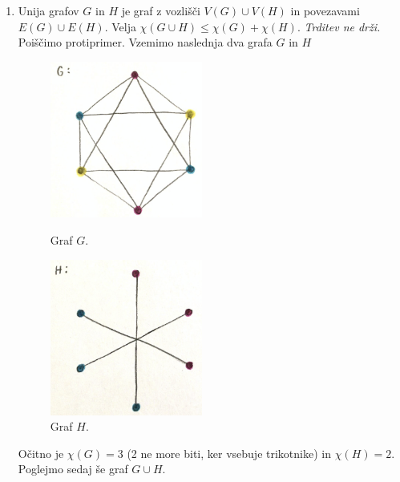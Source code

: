 \documentclass[a4paper,11pt]{article}
\begin{document}
\begin{enumerate}
    \item Unija grafov $G$ in $H$ je graf z vozlišči $V(G) \cup V(H)$ in povezavami $E(G) \cup E(H)$. Velja $\chi(G \cup H) \leq \chi(G) + \chi(H)$. \textit{Trditev ne drži.}
        \\
        Poiščimo protiprimer.
        Vzemimo naslednja dva grafa $G$ in $H$
        \begin{figure}[ht!]
            \begin{minipage}{0.5\textwidth}
                \centering
                \includegraphics[width=50mm]{Slike/G.png}
                \caption{Graf $G$.}
            \end{minipage}\hfill
            \begin{minipage}{0.5\textwidth}
                \centering
                \includegraphics[width=50mm]{Slike/H.png}
                \caption{Graf $H$.}
            \end{minipage}\hfill
        \end{figure}

        \noindent
        Očitno je $\chi(G) = 3$ (2 ne more biti, ker vsebuje trikotnike) in $\chi(H) = 2$.
        Poglejmo sedaj še graf $G \cup H$.


\end{enumerate}
\end{document}
